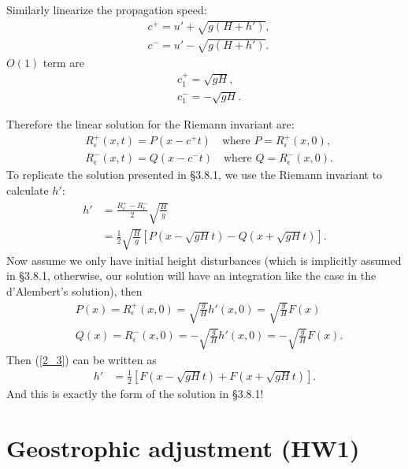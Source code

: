 \documentclass[11pt,letterpaper]{book}
\theoremstyle{definition}
\begin{document}
Similarly linearize the propagation speed:
\begin{align*}
&c^+ = u'+\sqrt{g(H+h')},\\
&c^- = u'-\sqrt{g(H+h')}.
\end{align*}
$O(1)$ term are
\begin{align*}
&c^+_1 = \sqrt{gH},\\
&c^-_1 = -\sqrt{gH}.
\end{align*}

Therefore the linear solution for the Riemann invariant are:
\begin{align*}
&R^+_\epsilon(x,t) = P(x-c^+t)\quad\text{where }P = R^+_\epsilon(x,0),\\
&R^-_\epsilon(x,t) = Q(x-c^-t)\quad\text{where }Q = R^-_\epsilon(x,0).
\end{align*}
To replicate the solution presented in \cite{vallis} \S 3.8.1, we use the Riemann invariant to calculate $h'$:
\begin{align}
h' &= \frac{R^+_\epsilon-R^-_\epsilon}{2}\sqrt{\frac{H}{g}}\nonumber\\
&= \frac{1}{2}\sqrt{\frac{H}{g}}\left[ P(x-\sqrt{gH} t)-Q(x+\sqrt{gH} t) \right].\label{2_3}
\end{align}
Now assume we only have initial height disturbances (which is implicitly assumed in \cite{vallis} \S 3.8.1, otherwise, our solution will have an integration like the case in the d'Alembert's solution), then
\begin{align*}
&P(x) = R^+_\epsilon(x,0) = \sqrt{\frac{g}{H}}h'(x,0) = \sqrt{\frac{g}{H}}F(x)\\
&Q(x) = R^-_\epsilon(x,0) = -\sqrt{\frac{g}{H}}h'(x,0) = -\sqrt{\frac{g}{H}}F(x).
\end{align*}
Then (\ref{2_3}) can be written as
\begin{align*}
h' &= \frac{1}{2}\left[ F(x-\sqrt{gH} t)+F(x+\sqrt{gH} t) \right].
\end{align*}
And this is exactly the form of the solution in \cite{vallis} \S 3.8.1!


\section{Geostrophic adjustment (HW1)}
\end{document}
